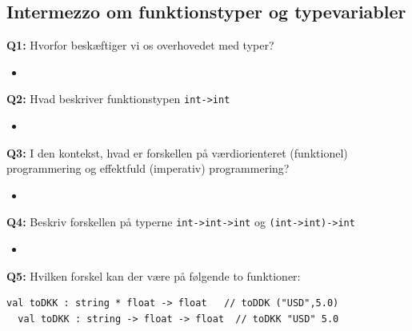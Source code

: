 \documentclass[rgb]{beamer}
\begin{document}
\subsection{Intermezzo om funktionstyper og typevariabler}

\begin{frame}[fragile]
\begin{footnotesize}


  \vspace{2mm}
  \textbf{Q1:} Hvorfor beskæftiger vi os overhovedet med typer?
  \vspace{1mm}

  \begin{itemize}
  \item \underline{\hspace{10cm}}
  \end{itemize}

  \vspace{2mm}
  \textbf{Q2:} Hvad beskriver funktionstypen \lstinline{int->int}
  \vspace{1mm}

  \begin{itemize}
  \item \underline{\hspace{10cm}}
  \end{itemize}

  \vspace{2mm}
  \textbf{Q3:} I den kontekst, hvad er forskellen på værdiorienteret (funktionel) programmering og effektfuld (imperativ) programmering?
  \vspace{1mm}

  \begin{itemize}
  \item \underline{\hspace{10cm}}
  \end{itemize}

  \vspace{2mm}
  \textbf{Q4:} Beskriv forskellen på typerne \lstinline{int->int->int} og \lstinline{(int->int)->int}
  \vspace{1mm}

  \begin{itemize}
  \item \underline{\hspace{10cm}}
  \end{itemize}

  \vspace{2mm}
  \textbf{Q5:} Hvilken forskel kan der være på følgende to funktioner:
  \vspace{1mm}
\begin{lstlisting}[frame=none]
  val toDKK : string * float -> float   // toDDK ("USD",5.0)
  val toDKK : string -> float -> float  // toDKK "USD" 5.0
\end{lstlisting}

\end{footnotesize}
\end{frame}
\end{document}
